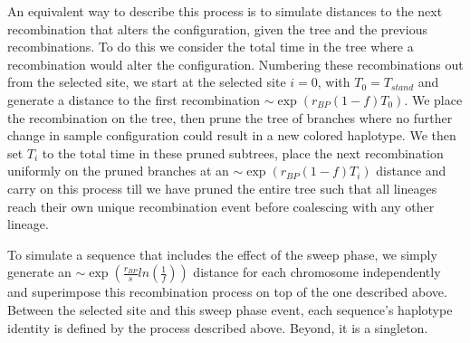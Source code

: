 \documentclass[a4paper,10pt]{article}
\begin{document}
An equivalent way to describe this process is to simulate distances to the next recombination that alters the configuration, given the tree and the previous recombinations. To do this we consider the total time in the tree where a recombination would alter the configuration. Numbering these recombinations out from the selected site,  we start at the selected site $i=0$, with $T_0 = T_{stand}$ and generate a distance to the first recombination $\sim \exp(r_{BP}\left(1-f\right) T_0)$. We place the recombination on the tree, then prune the tree of branches where no further change in sample configuration could result in a new colored haplotype. We then set $T_i$ to the total time in these pruned subtrees, place the next recombination uniformly on the pruned branches at an $\sim \exp(r_{BP}\left(1-f\right) T_i)$ distance and carry on this process till we have pruned the entire tree such that all lineages reach their own unique recombination event before coalescing with any other lineage.

To simulate a sequence that includes the effect of the sweep phase, we simply generate an $\sim \exp\left(\frac{r_{BP}}{s}ln\left(\frac{1}{f}\right)\right)$ distance for each chromosome independently and superimpose this recombination process on top of the one described above. Between the selected site and this sweep phase event, each sequence's haplotype identity is defined by the process described above. Beyond, it is a singleton.
\end{document}
